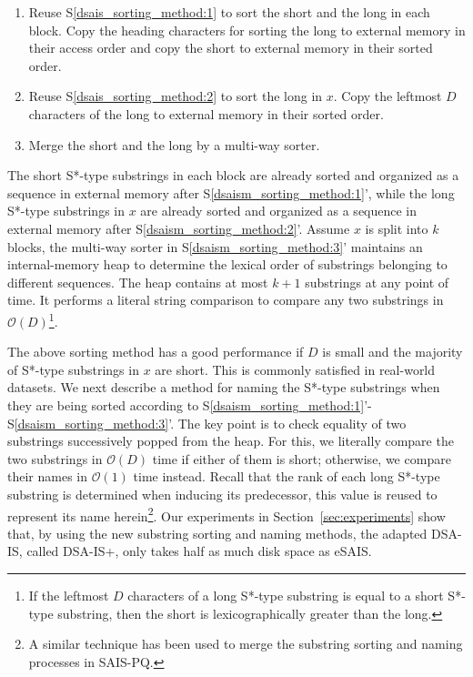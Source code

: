 \documentclass[10pt,journal,compsoc]{IEEEtran}
\begin{document}
\begin{enumerate}[S1']
	\item Reuse S\ref{dsais_sorting_method:1} to sort the short and the long in each block. Copy the heading characters for sorting the long to external memory in their access order and copy the short to external memory in their sorted order.~\label{dsaism_sorting_method:1}
		
	\item Reuse S\ref{dsais_sorting_method:2} to sort the long in $x$. Copy the leftmost $D$ characters of the long to external memory in their sorted order.~\label{dsaism_sorting_method:2}
	
	\item Merge the short and the long by a multi-way sorter.~\label{dsaism_sorting_method:3}
\end{enumerate}

The short S*-type substrings in each block are already sorted and organized as a sequence in external memory after S\ref{dsaism_sorting_method:1}', while the long S*-type substrings in $x$ are already sorted and organized as a sequence in external memory after S\ref{dsaism_sorting_method:2}'. Assume $x$ is split into $k$ blocks, the multi-way sorter in S\ref{dsaism_sorting_method:3}' maintains an internal-memory heap to determine the lexical order of substrings belonging to different sequences. The heap contains at most $k + 1$ substrings at any point of time. It performs a literal string comparison to compare any two substrings in $\mathcal{O}(D)$\footnote{If the leftmost $D$ characters of a long S*-type substring is equal to a short S*-type substring, then the short is lexicographically greater than the long.}. 

The above sorting method has a good performance if $D$ is small and the majority of S*-type substrings in $x$ are short. This is commonly satisfied in real-world datasets. We next describe a method for naming the S*-type substrings when they are being sorted according to S\ref{dsaism_sorting_method:1}'-S\ref{dsaism_sorting_method:3}'. The key point is to check equality of two substrings successively popped from the heap. For this, we literally compare the two substrings in $\mathcal{O}(D)$ time if either of them is short; otherwise, we compare their names in $\mathcal{O}(1)$ time instead. Recall that the rank of each long S*-type substring is determined when inducing its predecessor, this value is reused to represent its name herein\footnote{A similar technique has been used to merge the substring sorting and naming processes in SAIS-PQ.}. Our experiments in Section~\ref{sec:experiments} show that, by using the new substring sorting and naming methods, the adapted DSA-IS, called DSA-IS+, only takes half as much disk space as eSAIS.
\end{document}
